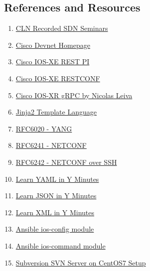 \subsection{References and Resources}
\begin{enumerate}
  \item \href{https://learningnetwork.cisco.com/community/learning_center/sdn_recorded_seminars}{CLN Recorded SDN Seminars}
  \item \href{https://developer.cisco.com/site/devnet/home/index.gsp}{Cisco Devnet Homepage}
  \item \href{http://www.cisco.com/c/en/us/td/docs/routers/csr1000/software/restapi/restapi/RESTAPIintro.html}{Cisco IOS-XE REST PI}
  \item \href{http://www.cisco.com/c/dam/global/cs_cz/assets/ciscoconnect/2014/assets/tech_sdn10_sp_netconf_yang_restconf_martinkramolis.pdf}{Cisco IOS-XE RESTCONF}
  \item \href{https://nleiva.github.io/xrgrpc/}{Cisco IOS-XR gRPC by Nicolas Leiva}
  \item \href{http://jinja.pocoo.org/docs/2.9/}{Jinja2 Template Language}
  \item \href{https://tools.ietf.org/html/rfc6020}{RFC6020 - YANG}
  \item \href{https://tools.ietf.org/html/rfc6241}{RFC6241 - NETCONF}
  \item \href{https://tools.ietf.org/html/rfc6242}{RFC6242 - NETCONF over SSH}
  \item \href{https://learnxinyminutes.com/docs/yaml/}{Learn YAML in Y Minutes}
  \item \href{https://learnxinyminutes.com/docs/json/}{Learn JSON in Y Minutes}
  \item \href{https://learnxinyminutes.com/docs/xml/}{Learn XML in Y Minutes}
  \item \href{https://docs.ansible.com/ansible/ios_config_module.html}{Ansible ios-config module}
  \item \href{https://docs.ansible.com/ansible/ios_command_module.html}{Ansible ios-command module}
  \item \href{https://www.vultr.com/docs/how-to-setup-an-apache-subversion-svn-server-on-centos-7}{Subversion SVN Server on CentOS7 Setup}
\end{enumerate}
